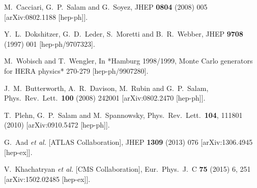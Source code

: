 \documentclass[preprintnumbers,superscriptaddress,nofootinbib,aps,prd,floatfix]{revtex4}
\begin{document}
\begin{thebibliography}{99}
  M.~Cacciari, G.~P.~Salam and G.~Soyez,
  JHEP {\bf 0804} (2008) 005
  [arXiv:0802.1188 [hep-ph]].
  
  Y.~L.~Dokshitzer, G.~D.~Leder, S.~Moretti and B.~R.~Webber,
  JHEP {\bf 9708} (1997) 001
  [hep-ph/9707323].
  
  M.~Wobisch and T.~Wengler,
  In *Hamburg 1998/1999, Monte Carlo generators for HERA physics* 270-279
  [hep-ph/9907280].
  
  J.~M.~Butterworth, A.~R.~Davison, M.~Rubin and G.~P.~Salam,
  Phys.\ Rev.\ Lett.\  {\bf 100} (2008) 242001
  [arXiv:0802.2470 [hep-ph]].
        
  T.~Plehn, G.~P.~Salam and M.~Spannowsky,
  Phys.\ Rev.\ Lett.\  {\bf 104}, 111801 (2010)
  [arXiv:0910.5472 [hep-ph]].

  G.~Aad {\it et al.}  [ATLAS Collaboration],
  JHEP {\bf 1309} (2013) 076
  [arXiv:1306.4945 [hep-ex]].
  
  V.~Khachatryan {\it et al.} [CMS Collaboration],
  Eur.\ Phys.\ J.\ C {\bf 75} (2015) 6,  251
  [arXiv:1502.02485 [hep-ex]].
  

\end{thebibliography}
\end{document}
